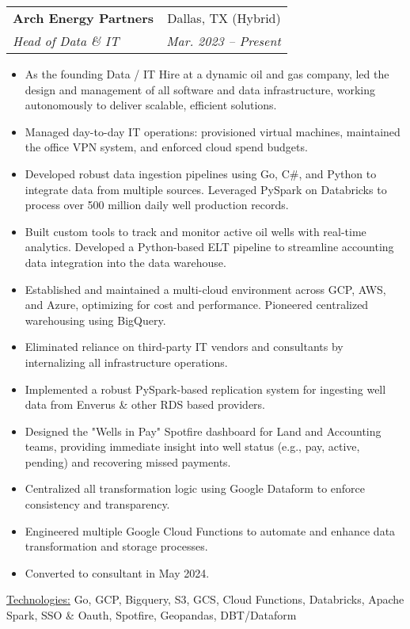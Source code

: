 \documentclass[11pt, a4paper]{article}
\makeatletter
\newcommand{\resumeItem}[1]{%
  \item\small{
    #1
  }
}
\newcommand{\resumeSubheading}[4]{
  \vspace{8pt}\item%
    \begin{tabular*}{0.97\textwidth}[t]{l@{\extracolsep{\fill}}r}
      \textbf{#1} & #2 \\
      \textit{\small#3} & \textit{\small #4} \\
    \end{tabular*}\vspace{-5pt}
}
\newcommand{\resumeItemListStart}{\begin{itemize}}
\newcommand{\resumeItemListEnd}{\end{itemize}\vspace{-5pt}}
\newcommand{\resumeTech}[2]{
 \underline{#1:} #2
}
\makeatother
\begin{document}
\resumeSubheading
  {Arch Energy Partners}{Dallas, TX (Hybrid)}
  {Head of Data \& IT}{Mar. 2023 – Present}
  \resumeItemListStart
    \resumeItem{As the founding Data / IT Hire at a dynamic oil and gas company, led the design and management of all software and data infrastructure, working autonomously to deliver scalable, efficient solutions.}
    \resumeItem{Managed day-to-day IT operations: provisioned virtual machines, maintained the office VPN system, and enforced cloud spend budgets.}
    \resumeItem{Developed robust data ingestion pipelines using Go, C\#, and Python to integrate data from multiple sources. Leveraged PySpark on Databricks to process over 500 million daily well production records.}
    \resumeItem{Built custom tools to track and monitor active oil wells with real-time analytics. Developed a Python-based ELT pipeline to streamline accounting data integration into the data warehouse.}
    \resumeItem{Established and maintained a multi-cloud environment across GCP, AWS, and Azure, optimizing for cost and performance. Pioneered centralized warehousing using BigQuery.}
    \resumeItem{Eliminated reliance on third-party IT vendors and consultants by internalizing all infrastructure operations.}
    \resumeItem{Implemented a robust PySpark-based replication system for ingesting well data from Enverus \& other RDS based providers.}
    \resumeItem{Designed the "Wells in Pay" Spotfire dashboard for Land and Accounting teams, providing immediate insight into well status (e.g., pay, active, pending) and recovering missed payments.}
    \resumeItem{Centralized all transformation logic using Google Dataform to enforce consistency and transparency.}
    \resumeItem{Engineered multiple Google Cloud Functions to automate and enhance data transformation and storage processes.}
    \resumeItem{Converted to consultant in May 2024.}
\resumeItemListEnd
\resumeTech{Technologies}{Go, GCP, Bigquery, S3, GCS, Cloud Functions, Databricks, Apache Spark, SSO \& Oauth, Spotfire, Geopandas, DBT/Dataform}
\end{document}
